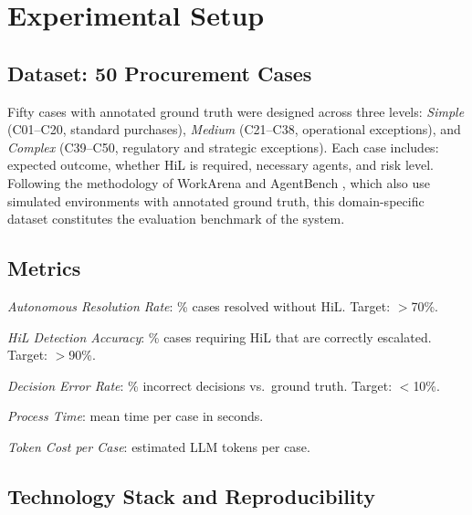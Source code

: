 \documentclass[preprint,12pt,authoryear]{elsarticle}
\begin{document}
\section{Experimental Setup}
\label{sec:setup}

\subsection{Dataset: 50 Procurement Cases}

Fifty cases with annotated ground truth were designed across three levels:
\emph{Simple} (C01--C20, standard purchases), \emph{Medium}
(C21--C38, operational exceptions), and \emph{Complex} (C39--C50, regulatory
and strategic exceptions).
Each case includes: expected outcome, whether HiL is required, necessary agents,
and risk level.
Following the methodology of WorkArena \citep{drouin2024workarena} and
AgentBench \citep{liu2023agentbench}, which also use simulated environments
with annotated ground truth, this domain-specific dataset constitutes the
evaluation benchmark of the system.

\subsection{Metrics}

\begin{description}[leftmargin=2.5cm, style=sameline]
  \item[ARR] \emph{Autonomous Resolution Rate}: \% cases resolved without HiL.
             Target: $>$70\%.
  \item[HDA] \emph{HiL Detection Accuracy}: \% cases requiring HiL that are
             correctly escalated. Target: $>$90\%.
  \item[DER] \emph{Decision Error Rate}: \% incorrect decisions vs.\ ground
             truth. Target: $<$10\%.
  \item[PT]  \emph{Process Time}: mean time per case in seconds.
  \item[TCC] \emph{Token Cost per Case}: estimated LLM tokens per case.
\end{description}

\subsection{Technology Stack and Reproducibility}
\end{document}
